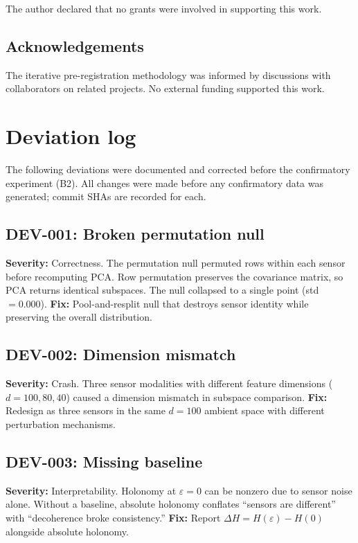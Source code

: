 \documentclass[11pt]{article}
\newcommand{\eps}{\varepsilon}
\begin{document}
The author declared that no grants were involved in supporting this
work.

\subsection*{Acknowledgements}

The iterative pre-registration methodology was informed by
discussions with collaborators on related projects.  No external
funding supported this work.




\appendix

\section{Deviation log}
\label{app:deviations}

The following deviations were documented and corrected before the
confirmatory experiment (B2).  All changes were made before any
confirmatory data was generated; commit SHAs are recorded for each.

\subsection*{DEV-001: Broken permutation null}
\textbf{Severity:} Correctness.
The permutation null permuted rows within each sensor before
recomputing PCA.  Row permutation preserves the covariance matrix,
so PCA returns identical subspaces.  The null collapsed to a single
point (std $= 0.000$).
\textbf{Fix:} Pool-and-resplit null that destroys sensor identity
while preserving the overall distribution.

\subsection*{DEV-002: Dimension mismatch}
\textbf{Severity:} Crash.
Three sensor modalities with different feature dimensions ($d =
100, 80, 40$) caused a dimension mismatch in subspace comparison.
\textbf{Fix:} Redesign as three sensors in the same $d = 100$
ambient space with different perturbation mechanisms.

\subsection*{DEV-003: Missing baseline}
\textbf{Severity:} Interpretability.
Holonomy at $\eps = 0$ can be nonzero due to sensor noise alone.
Without a baseline, absolute holonomy conflates ``sensors are
different'' with ``decoherence broke consistency.''
\textbf{Fix:} Report $\Delta H = H(\eps) - H(0)$ alongside
absolute holonomy.
\end{document}
